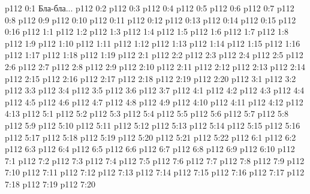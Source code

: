 \author{Одиночный Посланник}
\vs p112 0:1  Бла-бла...
\vs p112 0:2 \pc 
\vs p112 0:3 
\vs p112 0:4 
\vs p112 0:5 
\vs p112 0:6 
\vs p112 0:7 
\vs p112 0:8 
\vs p112 0:9 
\vs p112 0:10 
\vs p112 0:11 
\vs p112 0:12 
\vs p112 0:13 
\vs p112 0:14 
\vs p112 0:15 
\vs p112 0:16 
\vs p112 1:1 
\vs p112 1:2 
\vs p112 1:3 
\vs p112 1:4 
\vs p112 1:5 \pc 
\vs p112 1:6 
\vs p112 1:7 
\vs p112 1:8 
\vs p112 1:9 \pc 
\vs p112 1:10 
\vs p112 1:11 
\vs p112 1:12 
\vs p112 1:13 \pc 
\vs p112 1:14 
\vs p112 1:15 
\vs p112 1:16 
\vs p112 1:17 
\vs p112 1:18 
\vs p112 1:19 
\vs p112 2:1 
\vs p112 2:2 
\vs p112 2:3 
\vs p112 2:4 
\vs p112 2:5 
\vs p112 2:6 \pc 
\vs p112 2:7 \pc 
\vs p112 2:8 
\vs p112 2:9 
\vs p112 2:10 
\vs p112 2:11 \pc 
\vs p112 2:12 
\vs p112 2:13 
\vs p112 2:14 
\vs p112 2:15 
\vs p112 2:16 \pc 
\vs p112 2:17 
\vs p112 2:18 
\vs p112 2:19 \pc 
\vs p112 2:20 \pc 
{}
\vs p112 3:1 
\vs p112 3:2 
\vs p112 3:3 
\vs p112 3:4 
\vs p112 3:5 \pc 
\vs p112 3:6 
\vs p112 3:7 
\vs p112 4:1 
\vs p112 4:2 
\vs p112 4:3 
\vs p112 4:4 
\vs p112 4:5 
\vs p112 4:6 
\vs p112 4:7 
\vs p112 4:8 
\vs p112 4:9 
\vs p112 4:10 
\vs p112 4:11 
\vs p112 4:12 \pc 
\vs p112 4:13 
\vs p112 5:1 
\vs p112 5:2 
\vs p112 5:3 \pc 
\vs p112 5:4 
\vs p112 5:5 
\vs p112 5:6 \pc 
\vs p112 5:7 
\vs p112 5:8 
\vs p112 5:9 
\vs p112 5:10 
\vs p112 5:11 \pc 
\vs p112 5:12 
\vs p112 5:13 
\vs p112 5:14 
\vs p112 5:15 \pc 
\vs p112 5:16 \pc 
\vs p112 5:17 
\vs p112 5:18 
\vs p112 5:19 
\vs p112 5:20 \pc 
\vs p112 5:21 
\vs p112 5:22 
\vs p112 6:1 
\vs p112 6:2 
\vs p112 6:3 
\vs p112 6:4 \pc 
\vs p112 6:5 
\vs p112 6:6 
\vs p112 6:7 \pc 
\vs p112 6:8 
\vs p112 6:9 
\vs p112 6:10 \pc 
{}
\vs p112 7:1 
\vs p112 7:2 \pc 
\vs p112 7:3 
\vs p112 7:4 
\vs p112 7:5 
\vs p112 7:6 \pc 
\vs p112 7:7 \pc 
\vs p112 7:8 
\vs p112 7:9 
\vs p112 7:10 
\vs p112 7:11 \pc 
\vs p112 7:12 
\vs p112 7:13 
\vs p112 7:14 
\vs p112 7:15 \pc 
\vs p112 7:16 
\vs p112 7:17 
\vs p112 7:18 
\vs p112 7:19 \pc 
\vsetoff
\vs p112 7:20 
\quizlink
